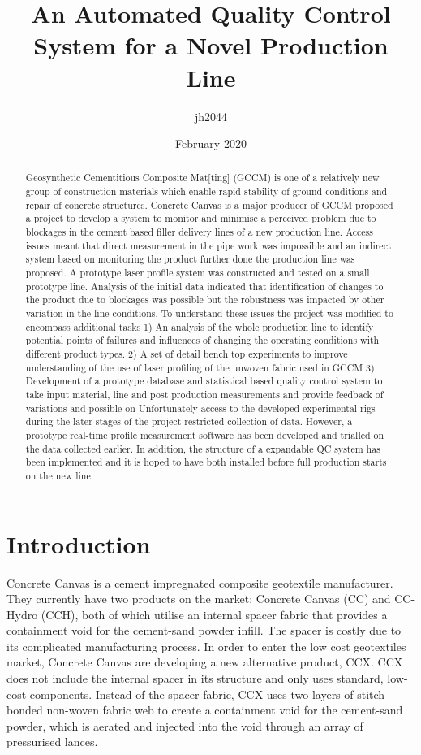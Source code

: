 \documentclass[12pt]{report}
\title{An Automated Quality Control System for a Novel Production Line}
\author{jh2044}
\date{February 2020}
\begin{document}
\maketitle

\begin{abstract}
Geosynthetic Cementitious Composite Mat[ting] (GCCM) is one of a relatively new group of construction materials which enable rapid stability of ground conditions and repair of concrete structures. Concrete Canvas is a major producer of GCCM proposed a project to develop a system to monitor and minimise a perceived problem due to blockages in the cement based filler delivery lines of a new production line. Access issues meant that direct measurement in the pipe work was impossible and an indirect system based on monitoring the product further done the production line was proposed. A prototype laser profile system was constructed and tested on a small prototype line. Analysis of the initial data indicated that identification of changes to the product due to blockages was possible but the robustness was impacted by other variation in the line conditions. To understand these issues the project was modified to encompass additional tasks  1) An analysis of the whole production line  to identify potential points of failures and influences of changing the operating conditions with different product types. 2) A set of detail bench top experiments to improve understanding of the use of laser profiling of the unwoven fabric used in GCCM 3) Development of a prototype database and statistical based quality control system to take input material, line and post production measurements and provide feedback of variations and possible on Unfortunately access to the developed experimental rigs during the later stages of the project restricted collection of data. However, a prototype real-time profile measurement software has been developed and trialled on the data collected earlier. In addition, the structure of a expandable QC system has been implemented and it is hoped to have both installed before full production starts on the new line.
    
    
\end{abstract}

\tableofcontents

\chapter{Introduction}
    Concrete Canvas is a cement impregnated composite geotextile manufacturer. They currently have two products on the market: Concrete Canvas (CC) and CC-Hydro (CCH), both of which utilise an internal spacer fabric that provides a containment void for the cement-sand powder infill. The spacer is costly due to its complicated manufacturing process. In order to enter the low cost geotextiles market, Concrete Canvas are developing a new alternative product, CCX. CCX does not include the internal spacer in its structure and only uses standard, low-cost components. Instead of the spacer fabric, CCX uses two layers of stitch bonded non-woven fabric web to create a containment void for the cement-sand powder, which is aerated and injected into the void through an array of pressurised lances.
    
\end{document}
